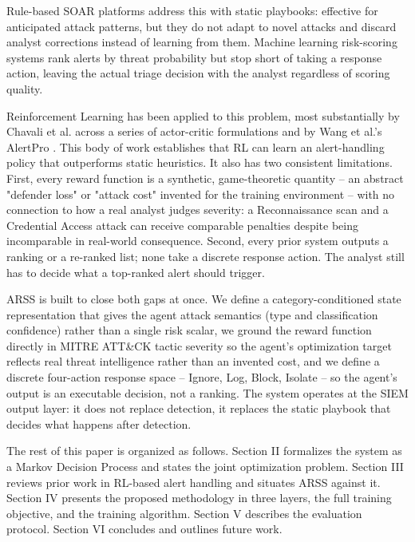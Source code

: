 \documentclass[conference]{IEEEtran}
\begin{document}
Rule-based SOAR platforms address this with static playbooks: effective for anticipated attack patterns, but they do not adapt to novel attacks and discard analyst corrections instead of learning from them. Machine learning risk-scoring systems rank alerts by threat probability but stop short of taking a response action, leaving the actual triage decision with the analyst regardless of scoring quality.

Reinforcement Learning has been applied to this problem, most substantially by Chavali et al. across a series of actor-critic formulations \cite{chavali2022,chavali2024,knap2024,chavali2025multicrit} and by Wang et al.'s AlertPro \cite{alertpro2024}. This body of work establishes that RL can learn an alert-handling policy that outperforms static heuristics. It also has two consistent limitations. First, every reward function is a synthetic, game-theoretic quantity -- an abstract "defender loss" or "attack cost" invented for the training environment -- with no connection to how a real analyst judges severity: a Reconnaissance scan and a Credential Access attack can receive comparable penalties despite being incomparable in real-world consequence. Second, every prior system outputs a ranking or a re-ranked list; none take a discrete response action. The analyst still has to decide what a top-ranked alert should trigger.

ARSS is built to close both gaps at once. We define a category-conditioned state representation that gives the agent attack semantics (type and classification confidence) rather than a single risk scalar, we ground the reward function directly in MITRE ATT\&CK tactic severity so the agent's optimization target reflects real threat intelligence rather than an invented cost, and we define a discrete four-action response space -- Ignore, Log, Block, Isolate -- so the agent's output is an executable decision, not a ranking. The system operates at the SIEM output layer: it does not replace detection, it replaces the static playbook that decides what happens after detection.

The rest of this paper is organized as follows. Section II formalizes the system as a Markov Decision Process and states the joint optimization problem. Section III reviews prior work in RL-based alert handling and situates ARSS against it. Section IV presents the proposed methodology in three layers, the full training objective, and the training algorithm. Section V describes the evaluation protocol. Section VI concludes and outlines future work.
\end{document}
